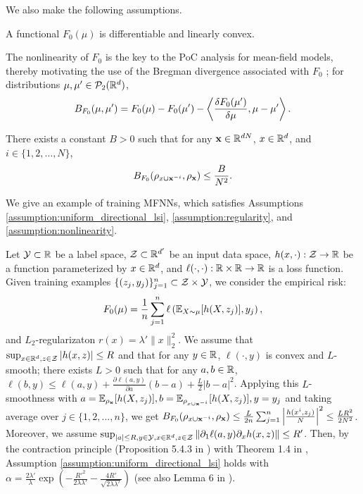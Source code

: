 We also make the following assumptions.
\begin{assumption}\label{assumption:regularity}
    A functional $F_0(\mu)$ is differentiable and linearly convex. 
\end{assumption}

The nonlinearity of $F_0$ is the key to the PoC analysis for mean-field models, thereby motivating the use of the Bregman divergence associated with $F_0$ \citep{nitanda2024improved}; for distributions $\mu, \mu' \in \mathcal{P}_2(\mathbb{R}^d)$,
\[ B_{F_0}(\mu,\mu') = F_0(\mu) - F_0(\mu') - \pd< \frac{\delta F_0(\mu')}{\delta \mu}, \mu-\mu'>. \]

\begin{assumption}\label{assumption:nonlinearity}
    There exists a constant $B>0$ such that for any $\mathbf{x} \in \mathbb{R}^{dN}$, $x \in \mathbb{R}^d$, and $i \in \{1,2,\ldots,N\}$,
    \[ B_{F_0}(\rho_{x\cup \mathbf{x}^{-i}},\rho_{\mathbf{x}}) \leq \frac{B}{N^2}. \]
\end{assumption}
We give an example of training MFNNs, which satisfies Assumptions \ref{assumption:uniform_directional_lsi}, \ref{assumption:regularity}, and \ref{assumption:nonlinearity}.
\begin{example}\label{eg:mean-field-nn}
    Let $\mathcal{Y} \subset \mathbb{R}$ be a label space, $\mathcal{Z} \subset \mathbb{R}^{d'}$ be an input data space, $h(x,\cdot): \mathcal{Z} \to \mathbb{R}$ be a function parameterized by $x \in \mathbb{R}^d$, and $\ell(\cdot,\cdot): \mathbb{R}\times \mathbb{R} \to \mathbb{R}$ is a loss function. Given training examples $\{(z_j,y_j)\}_{j=1}^n \subset \mathcal{Z} \times \mathcal{Y}$, we consider the empirical risk: 
    \[ F_0(\mu) = \frac{1}{n}\sum_{j=1}^n \ell\left(\mathbb{E}_{X\sim\mu}[h(X,z_j)],y_j\right), \]
    and $L_2$-regularizaton $r(x) = \lambda'\|x\|_2^2$.
    We assume that $\sup_{x\in \mathbb{R}^d, z\in \mathcal{Z}}|h(x,z)| \leq R$ and that for any $y\in\mathbb{R}$, $\ell(\cdot,y)$ is convex and $L$-smooth; there exists $L > 0$ such that for any $a,b \in \mathbb{R}$, $\ell(b,y) \leq \ell(a,y) + \frac{\partial \ell(a,y)}{\partial a}(b-a) + \frac{L}{2}|b-a|^2$.
    Applying this $L$-smoothness with $a=\mathbb{E}_{\rho_{\mathbf{x}}}[h(X,z_j)], b=\mathbb{E}_{\rho_{x\cup\mathbf{x}^{-i}}}[h(X,z_j)], y=y_j$ and taking average over $j\in\{1,2,\ldots,n\}$, we get $B_{F_0}(\rho_{x\cup \mathbf{x}^{-i}},\rho_{\mathbf{x}}) \leq \frac{L}{2n}\sum_{j=1}^n \left| \frac{h(x^i,z_j)}{N}\right|^2 \leq \frac{LR^2}{2N^2}$.
    Moreover, we assume $\sup_{|a|\leq R, y\in\mathcal{Y}, x\in \mathbb{R}^d, z \in \mathcal{Z}} \|\partial_1 \ell(a,y) \partial_x  h(x,z)\| \leq R'$.
    Then, by the contraction principle (Proposition 5.4.3 in \citet{bakry2014analysis}) with Theorem 1.4 in \citet{brigati2024heat}, Assumption \ref{assumption:uniform_directional_lsi} holds with $\alpha=\frac{2\lambda'}{\lambda}\exp\left( -\frac{R'^{2}}{2\lambda\lambda'} - \frac{4R'}{\sqrt{2\lambda\lambda'}} \right)$ (see also Lemma 6 in \citet{chewi2024uniform}).
\end{example}
